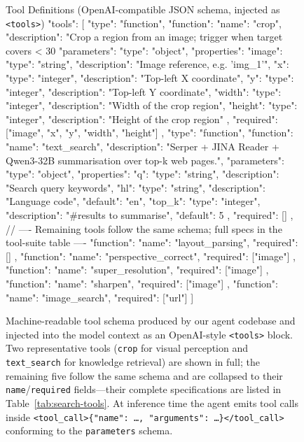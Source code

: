 \begin{figure}[htbp]
\centering
\begin{toolsjson}{Tool Definitions (OpenAI-compatible JSON schema, injected as \texttt{<tools>})}
{
  "tools": [
    {
      "type": "function",
      "function": {
        "name": "crop",
        "description": "Crop a region from an image; trigger when target covers < 30%
        "parameters": {
          "type": "object",
          "properties": {
            "image":  {"type": "string",  "description": "Image reference, e.g. 'img_1'"},
            "x":      {"type": "integer", "description": "Top-left X coordinate"},
            "y":      {"type": "integer", "description": "Top-left Y coordinate"},
            "width":  {"type": "integer", "description": "Width of the crop region"},
            "height": {"type": "integer", "description": "Height of the crop region"}
          },
          "required": ["image", "x", "y", "width", "height"]
        }
      }
    },
    {
      "type": "function",
      "function": {
        "name": "text_search",
        "description": "Serper + JINA Reader + Qwen3-32B summarisation over top-k web pages.",
        "parameters": {
          "type": "object",
          "properties": {
            "q":     {"type": "string",  "description": "Search query keywords"},
            "hl":    {"type": "string",  "description": "Language code", "default": "en"},
            "top_k": {"type": "integer", "description": "#results to summarise", "default": 5}
          },
          "required": []
        }
      }
    },
    // ---- Remaining tools follow the same schema; full specs in the tool-suite table ----
    { "function": { "name": "layout_parsing",      "required": []         } },
    { "function": { "name": "perspective_correct", "required": ["image"]  } },
    { "function": { "name": "super_resolution",    "required": ["image"]  } },
    { "function": { "name": "sharpen",             "required": ["image"]  } },
    { "function": { "name": "image_search",        "required": ["url"]    } }
  ]
}
\end{toolsjson}
\caption{Machine-readable tool schema produced by our agent codebase and injected into the model context as an OpenAI-style \texttt{<tools>} block. Two representative tools (\texttt{crop} for visual perception and \texttt{text\_search} for knowledge retrieval) are shown in full; the remaining five follow the same schema and are collapsed to their \texttt{name}/\texttt{required} fields---their complete specifications are listed in Table~\ref{tab:search-tools}. At inference time the agent emits tool calls inside \texttt{<tool\_call>\{"name": \ldots, "arguments": \ldots\}</tool\_call>} conforming to the \texttt{parameters} schema.}
\label{apdxfig:tool-defs}
\end{figure}

